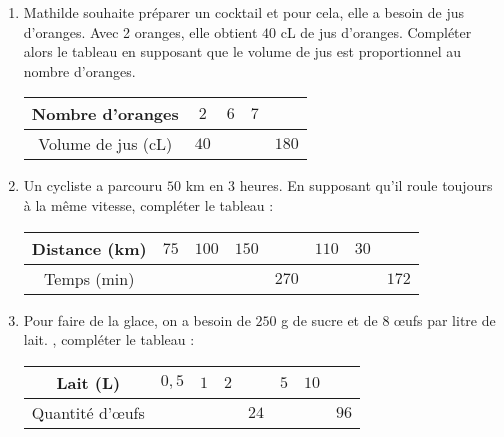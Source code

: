 \begin{pageAD} 




 \begin{enumerate}
 \item Mathilde souhaite préparer un cocktail et pour cela, elle a besoin de jus d'oranges.
 Avec 2 oranges, elle obtient $40$ cL de jus d'oranges. Compléter alors le tableau en supposant que le volume de jus est proportionnel au nombre d'oranges.
 \begin{center}
     \begin{tabular}{|c|c|c|c|c|}\hline
         Nombre d'oranges & $2$ & $6$ & $7$ &  \\
         \hline Volume de jus (cL) & $40$ &  & & $180$ \\\hline
     \end{tabular}
 \end{center}
 
 
 \item Un cycliste a parcouru $50$ km en 3 heures. En supposant qu’il roule toujours à la
 même vitesse, compléter le tableau :
 \begin{center}
     \begin{tabular}{|c|c|c|c|c|c|c|c|}\hline
         Distance (km) & $75$ & $100$ & $150$ &  & $110$ & $30$ &  \\\hline
          Temps (min) &  &   & & $270$ & & & $172$ \\\hline
     \end{tabular}
 \end{center} 
 

 \item Pour faire de la glace, on a besoin de $250$ g de sucre et de $8$ œufs par litre de lait. , compléter le tableau :
 \begin{center}
     \begin{tabular}{|c|c|c|c|c|c|c|c|}\hline
         Lait (L) & $0,5$ & $1$ & $2$ &  & $5$ & $10$ &  \\\hline
          Quantité d'œufs &  &   & & $24$ & & &  $96$ \\\hline
     \end{tabular}
 \end{center} 
 
 \end{enumerate}


 

\end{pageAD} 
 

